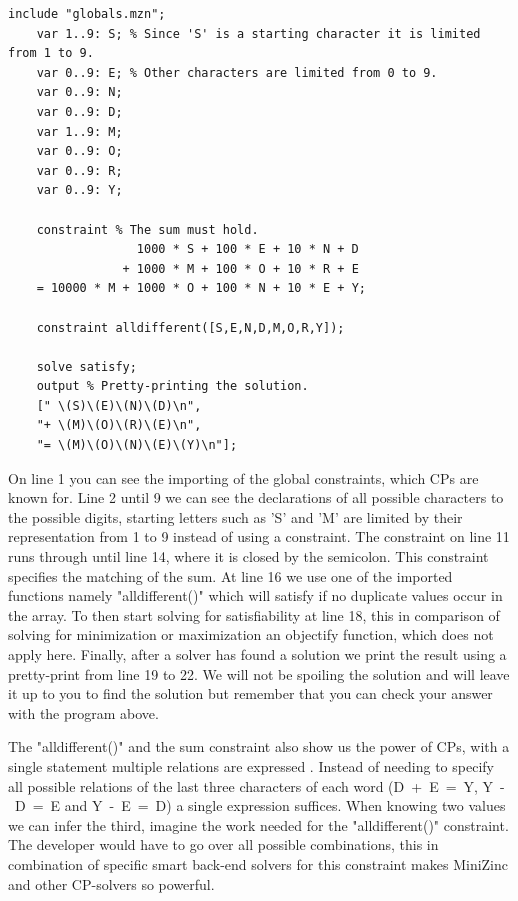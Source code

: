 \label{lst:SendMoreMoney}
\begin{lstlisting}[float=t,language=minizinc, caption={Solution to the puzzle "send more money" slightly modified from \url{https://www.minizinc.org/doc-2.5.5/en/downloads/send-more-money.mzn}}]
	include "globals.mzn";
	var 1..9: S; % Since 'S' is a starting character it is limited from 1 to 9.
	var 0..9: E; % Other characters are limited from 0 to 9.
	var 0..9: N;
	var 0..9: D;
	var 1..9: M;
	var 0..9: O;
	var 0..9: R;
	var 0..9: Y;
	
	constraint % The sum must hold.
	              1000 * S + 100 * E + 10 * N + D
	            + 1000 * M + 100 * O + 10 * R + E
	= 10000 * M + 1000 * O + 100 * N + 10 * E + Y;
	
	constraint alldifferent([S,E,N,D,M,O,R,Y]);
	
	solve satisfy;
	output % Pretty-printing the solution.
	[" \(S)\(E)\(N)\(D)\n",
	"+ \(M)\(O)\(R)\(E)\n",
	"= \(M)\(O)\(N)\(E)\(Y)\n"];
\end{lstlisting}
\label{sendMoreMoneyExplanation}
On line 1 you can see the importing of the global constraints, which CPs are known for. Line 2 until 9 we can see the declarations of all possible characters to the possible digits, starting letters such as 'S' and 'M' are limited by their representation from 1 to 9 instead of using a constraint. The constraint on line 11 runs through until line 14, where it is closed by the semicolon. This constraint specifies the matching of the sum. At line 16 we use one of the imported functions namely "alldifferent()" which will satisfy if no duplicate values occur in the array. To then start solving for satisfiability at line 18, this in comparison of solving for minimization or maximization an objectify function, which does not apply here. Finally, after a solver has found a solution we print the result using a pretty-print from line 19 to 22.
We will not be spoiling the solution and will leave it up to you to find the solution but remember that you can check your answer with the program above.

The "alldifferent()" and the sum constraint also show us the power of CPs, with a single statement multiple relations are expressed \cite{53marriott1998programming}. Instead of needing to specify all possible relations of the last three characters of each word (\mbox{D + E = Y}, \mbox{Y - D = E} and \mbox{Y - E = D}) a single expression suffices. When knowing two values we can infer the third, imagine the work needed for the "alldifferent()" constraint. The developer would have to go over all possible combinations, this in combination of specific smart back-end solvers for this constraint makes MiniZinc and other CP-solvers so powerful. 

